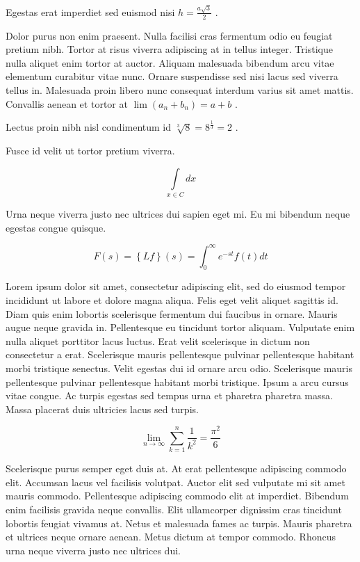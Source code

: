 \documentclass{article}
\begin{document}
	
    Egestas erat imperdiet sed euismod nisi 
    \begin{math}
    h=\frac{a\sqrt{3}}{2}
    \end{math}
    .
    \newline
    
    Dolor purus non enim praesent. Nulla facilisi cras fermentum odio eu feugiat pretium nibh. Tortor at risus viverra adipiscing at in tellus integer. Tristique nulla aliquet enim tortor at auctor. Aliquam malesuada bibendum arcu vitae elementum curabitur vitae nunc. Ornare suspendisse sed nisi lacus sed viverra tellus in. Malesuada proin libero nunc consequat interdum varius sit amet mattis. Convallis aenean et tortor at 
    $ \lim\left ( a_n+b_n \right )=a+b $
    .
    \newline
    
    Lectus proin nibh nisl condimentum id 
    \( \sqrt[3]{8}=8^{\frac{1}{3}}=2 \)
    .
    \newline
    
    Fusce id velit ut tortor pretium viverra.
    
    \[ \int\limits_{x\in C}dx  \]
    
    Urna neque viverra justo nec ultrices dui sapien eget mi. Eu mi bibendum neque egestas congue quisque.
    
    $$ F\left ( s \right )=\left \{ Lf \right \}\left ( s \right )= \int_{0}^{\infty } e^{-st}f\left ( t \right ) dt $$
    
    Lorem ipsum dolor sit amet, consectetur adipiscing elit, sed do eiusmod tempor incididunt ut labore et dolore magna aliqua. Felis eget velit aliquet sagittis id. Diam quis enim lobortis scelerisque fermentum dui faucibus in ornare. Mauris augue neque gravida in. Pellentesque eu tincidunt tortor aliquam. Vulputate enim nulla aliquet porttitor lacus luctus. Erat velit scelerisque in dictum non consectetur a erat. Scelerisque mauris pellentesque pulvinar pellentesque habitant morbi tristique senectus. Velit egestas dui id ornare arcu odio. Scelerisque mauris pellentesque pulvinar pellentesque habitant morbi tristique. Ipsum a arcu cursus vitae congue. Ac turpis egestas sed tempus urna et pharetra pharetra massa. Massa placerat duis ultricies lacus sed turpis.
    
    \begin{displaymath}
    	\lim_{n \to \infty}\sum_{k=1}^n \frac{1}{k^2}= \frac{\pi^2}{6}
    \end{displaymath}
    
   Scelerisque purus semper eget duis at. At erat pellentesque adipiscing commodo elit. Accumsan lacus vel facilisis volutpat. Auctor elit sed vulputate mi sit amet mauris commodo. Pellentesque adipiscing commodo elit at imperdiet. Bibendum enim facilisis gravida neque convallis. Elit ullamcorper dignissim cras tincidunt lobortis feugiat vivamus at. Netus et malesuada fames ac turpis. Mauris pharetra et ultrices neque ornare aenean. Metus dictum at tempor commodo. Rhoncus urna neque viverra justo nec ultrices dui.
    
\end{document}
